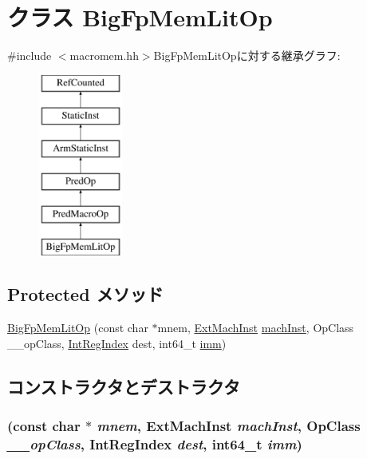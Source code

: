 \hypertarget{classArmISA_1_1BigFpMemLitOp}{
\section{クラス BigFpMemLitOp}
\label{classArmISA_1_1BigFpMemLitOp}
}


{\ttfamily \#include $<$macromem.hh$>$}BigFpMemLitOpに対する継承グラフ:\begin{figure}[H]
\begin{center}
\leavevmode
\includegraphics[height=6cm]{classArmISA_1_1BigFpMemLitOp}
\end{center}
\end{figure}
\subsection*{Protected メソッド}
\begin{DoxyCompactItemize}
\item 
\hyperlink{classArmISA_1_1BigFpMemLitOp_ae9b7f29814341fd8f960c9f031bf14bc}{BigFpMemLitOp} (const char $\ast$mnem, \hyperlink{classStaticInst_a5605d4fc727eae9e595325c90c0ec108}{ExtMachInst} \hyperlink{classStaticInst_a744598b194ca3d4201d9414ce4cc4af4}{machInst}, OpClass \_\-\_\-opClass, \hyperlink{namespaceArmISA_ae64680ba9fb526106829d6bf92fc791b}{IntRegIndex} dest, int64\_\-t \hyperlink{namespaceArmISA_a2308526fcc9af84548a72f9ba3102ec1}{imm})
\end{DoxyCompactItemize}


\subsection{コンストラクタとデストラクタ}
\hypertarget{classArmISA_1_1BigFpMemLitOp_ae9b7f29814341fd8f960c9f031bf14bc}{
\subsubsection[{BigFpMemLitOp}]{ (const char $\ast$ {\em mnem}, \/  {\bf ExtMachInst} {\em machInst}, \/  OpClass {\em \_\-\_\-opClass}, \/  {\bf IntRegIndex} {\em dest}, \/  int64\_\-t {\em imm})}}
\label{classArmISA_1_1BigFpMemLitOp_ae9b7f29814341fd8f960c9f031bf14bc}



